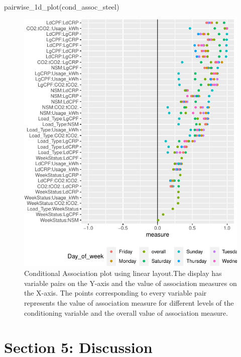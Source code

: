 \begin{Schunk}
\begin{Sinput}
pairwise_1d_plot(cond_assoc_steel)
\end{Sinput}
\begin{figure}

{\centering \includegraphics{rj_paper_files/figure-latex/linear-cond-assoc-1} 

}

\caption[Conditional Association plot using linear layout.The display has variable pairs on the Y-axis and the value of association measures on the X-axis]{Conditional Association plot using linear layout.The display has variable pairs on the Y-axis and the value of association measures on the X-axis. The points corresponding to every variable pair represents the value of association measure for different levels of the conditioning variable and the overall value of association measure.}\label{fig:linear-cond-assoc}
\end{figure}
\end{Schunk}

\hypertarget{section-5-discussion}{%
\section{Section 5: Discussion}\label{section-5-discussion}}

